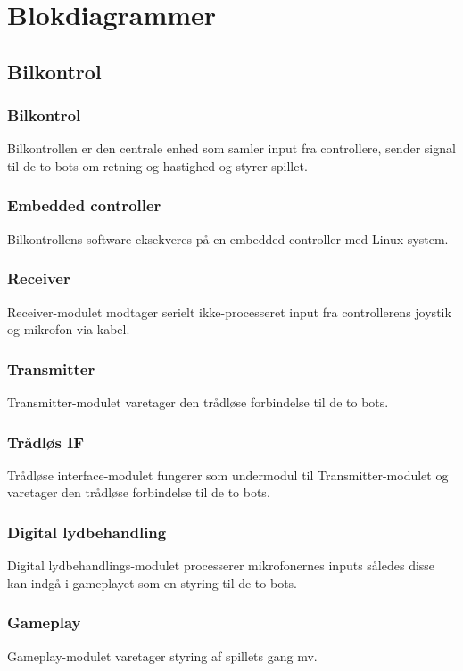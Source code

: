 \section{Blokdiagrammer}

\subsection{Bilkontrol}

\subsubsection*{\textbf{Bilkontrol}}
Bilkontrollen er den centrale enhed som samler input fra controllere, sender signal til de to bots om retning og hastighed og styrer spillet. 
\subsubsection*{\textbf{Embedded controller}}
Bilkontrollens software eksekveres på en embedded controller med Linux-system. 
\subsubsection*{\textbf{Receiver}}
Receiver-modulet modtager serielt ikke-processeret input fra controllerens joystik og mikrofon via kabel. 
\subsubsection*{\textbf{Transmitter}}
Transmitter-modulet varetager den trådløse forbindelse til de to bots.
\subsubsection*{\textbf{Trådløs IF}}
Trådløse interface-modulet fungerer som undermodul til Transmitter-modulet og varetager den trådløse forbindelse til de to bots. 
\subsubsection*{\textbf{Digital lydbehandling}}
Digital lydbehandlings-modulet processerer mikrofonernes inputs således disse kan indgå i gameplayet som en styring til de to bots.  
\subsubsection*{\textbf{Gameplay}}
Gameplay-modulet varetager styring af spillets gang mv.  
